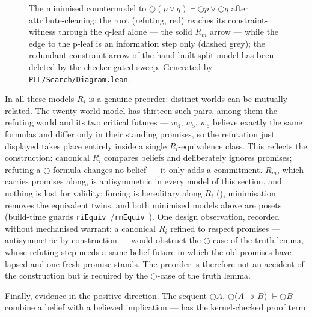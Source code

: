 \begin{figure}
\centering

\caption{The minimised countermodel to
\ensuremath{\bigcirc(p \vee q) \vdash \bigcirc p \vee \bigcirc q} after
attribute-cleaning: the root (refuting, red) reaches its
constraint-witness through the q-leaf alone --- the solid
\ensuremath{R_{m}} arrow --- while the edge to the p-leaf is an
information step only (dashed grey); the redundant constraint arrow of
the hand-built split model has been deleted by the checker-gated sweep.
Generated by \texttt{PLL/\allowbreak{}Search/\allowbreak{}Diagram.lean}.}
\label{fig:ordist}
\end{figure}

\begin{remark}\label{rem:preorder}
In all these models \ensuremath{R_{i}} is a genuine preorder: distinct worlds can be
mutually related. The twenty-world model has thirteen such pairs, among
them the refuting world and its two critical futures --- \ensuremath{w_{4}}, \ensuremath{w_{5}}, \ensuremath{w_{6}}
believe exactly the same formulas and differ only in their standing
promises, so the refutation just displayed takes place entirely
inside a single \ensuremath{R_{i}}-equivalence class. This reflects the
construction: canonical \ensuremath{R_{i}} compares beliefs and deliberately ignores
promises; refuting a \ensuremath{\bigcirc}-formula changes no belief --- it only adds
a commitment. \ensuremath{R_{m}}, which carries promises along, is antisymmetric in
every model of this section, and nothing is lost for validity: forcing
is hereditary along \ensuremath{R_{i}} (), minimisation removes
the equivalent twins, and both minimised models above are posets
(build-time guards \texttt{riEquiv}~/\texttt{rmEquiv}~). One design observation, recorded without
mechanised warrant: a canonical \ensuremath{R_{i}} refined to respect promises ---
antisymmetric by construction --- would obstruct the \ensuremath{\bigcirc}-case of the
truth lemma, whose refuting step needs a same-belief future in which
the old promises have lapsed and one fresh promise stands. The preorder
is therefore not an accident of the construction but is required by the
\ensuremath{\bigcirc}-case of the truth lemma.
\end{remark}

Finally, evidence in the positive direction. The sequent
\ensuremath{\bigcirc A}, \ensuremath{\bigcirc}(\ensuremath{A \twoheadrightarrow B}) \ensuremath{\vdash \bigcirc B} --- combine a belief with a believed implication --- has
the kernel-checked proof term

